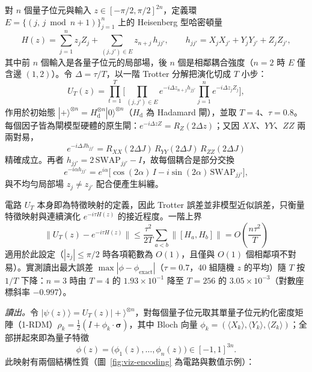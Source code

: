 \documentclass[10pt,a4paper]{article}
\begin{document}
對 $n$ 個量子位元與輸入 $z\in[-\pi/2,\pi/2]^{2n}$，定義環 $E=\{(j,\,j\bmod n+1)\}_{j=1}^{n}$ 上的 Heisenberg 型哈密頓量
\begin{equation}
    H(z)=\sum_{j=1}^{n}z_jZ_j+\sum_{(j,j')\in E}z_{n+j}\,h_{jj'},\qquad
    h_{jj'}=X_jX_{j'}+Y_jY_{j'}+Z_jZ_{j'},
    \label{eq:hamiltonian}
\end{equation}
其中前 $n$ 個輸入是各量子位元的局部場，後 $n$ 個是相鄰耦合強度（$n=2$ 時 $E$ 僅含邊 $(1,2)$）。令 $\Delta=\tau/T$，以一階 Trotter 分解把演化切成 $T$ 小步：
\begin{equation}
    U_T(z)=\prod_{t=1}^{T}\Bigg[\prod_{(j,j')\in E}e^{-i\Delta z_{n+j}h_{jj'}}\prod_{j=1}^{n}e^{-i\Delta z_jZ_j}\Bigg],
    \label{eq:trotter}
\end{equation}
作用於初始態 $|{+}\rangle^{\otimes n}=H_{\mathrm{d}}^{\otimes n}|0\rangle^{\otimes n}$（$H_{\mathrm{d}}$ 為 Hadamard 閘），並取 $T=4$、$\tau=0.8$。每個因子皆為閘模型硬體的原生閘：$e^{-i\Delta z Z}=R_Z(2\Delta z)$；又因 $XX$、$YY$、$ZZ$ 兩兩對易，
\begin{equation}
    e^{-i\Delta J h_{jj'}}=R_{XX}(2\Delta J)\,R_{YY}(2\Delta J)\,R_{ZZ}(2\Delta J)
\end{equation}
精確成立。再者 $h_{jj'}=2\,\mathrm{SWAP}_{jj'}-I$，故每個耦合是部分交換
\begin{equation}
    e^{-i\alpha h_{jj'}}=e^{i\alpha}\big[\cos(2\alpha)\,I-i\sin(2\alpha)\,\mathrm{SWAP}_{jj'}\big],
    \label{eq:partial-swap}
\end{equation}
與不均勻局部場 $z_j\neq z_{j'}$ 配合便產生糾纏。

電路 $U_T$ 本身即為特徵映射的定義，因此 Trotter 誤差並非模型近似誤差，只衡量特徵映射與連續演化 $e^{-i\tau H(z)}$ 的接近程度。一階上界~\cite{lloyd1996,childs2021trotter}
\begin{equation}
    \big\|U_T(z)-e^{-i\tau H(z)}\big\|\le\frac{\tau^2}{2T}\sum_{a<b}\big\|[H_a,H_b]\big\|=O\!\left(\frac{n\tau^2}{T}\right)
    \label{eq:trotter-error}
\end{equation}
適用於此設定（$|z_j|\le\pi/2$ 時各項範數為 $O(1)$，且僅與 $O(1)$ 個相鄰項不對易）。實測讀出最大誤差 $\max|\phi-\phi_{\mathrm{exact}}|$（$\tau=0.7$，40 組隨機 $z$ 的平均）隨 $T$ 按 $1/T$ 下降：$n=3$ 時由 $T=4$ 的 $1.93\times10^{-1}$ 降至 $T=256$ 的 $3.05\times10^{-3}$（對數座標斜率 $-0.997$）。

\textit{讀出。}令 $|\psi(z)\rangle=U_T(z)|{+}\rangle^{\otimes n}$，對每個量子位元取其單量子位元約化密度矩陣（1-RDM）$\rho_k=\tfrac12(I+\phi_k\cdot\boldsymbol{\sigma})$，其中 Bloch 向量 $\phi_k=(\langle X_k\rangle,\langle Y_k\rangle,\langle Z_k\rangle)$；全部拼起來即為量子特徵
\begin{equation}
    \phi(z)=\big(\phi_1(z),\dots,\phi_n(z)\big)\in[-1,1]^{3n}.
    \label{eq:readout}
\end{equation}
此映射有兩個結構性質（圖~\ref{fig:viz-encoding} 為電路與數值示例）：
\end{document}
